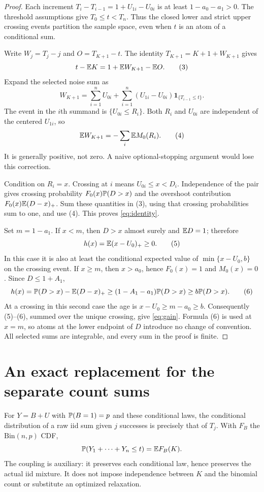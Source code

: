 \documentclass[11pt]{article}
\begin{document}
\begin{proof}
Each increment $T_i-T_{i-1}=1+U_{1i}-U_{0i}$ is at least
$1-a_0-a_1>0$. The threshold assumptions give $T_0\le t<T_n$.
Thus the closed lower and strict upper crossing events partition the
sample space, even when $t$ is an atom of a conditional sum.

Write $W_j=T_j-j$ and $O=T_{K+1}-t$. The identity
$T_{K+1}=K+1+W_{K+1}$ gives
\[
                   t-\mathbb E K=1+\mathbb E W_{K+1}-\mathbb E O.               \tag{3}
\]
Expand the selected noise sum as
\[
 W_{K+1}=\sum_{i=1}^n U_{0i}
       +\sum_{i=1}^n(U_{1i}-U_{0i})\mathbf1_{\{T_{i-1}\le t\}}.
\]
The event in the $i$th summand is $\{U_{0i}\le R_i\}$.
Both $R_i$ and $U_{0i}$ are independent of the centered $U_{1i}$, so
\[
                      \mathbb E W_{K+1}=-\sum_i\mathbb E M_0(R_i).       \tag{4}
\]
It is generally positive, not zero. A naive optional-stopping argument
would lose this correction.

Condition on $R_i=x$. Crossing at $i$ means $U_{0i}\le x<D_i$.
Independence of the pair gives crossing probability
$F_0(x)\mathbb P(D>x)$ and the overshoot contribution
$F_0(x)\mathbb E(D-x)_+$. Sum these quantities in (3), using that crossing
probabilities sum to one, and use (4). This proves \eqref{eq:identity}.

Set $m=1-a_1$. If $x<m$, then $D>x$ almost surely and $\mathbb E D=1$;
therefore
\[
                         h(x)=\mathbb E(x-U_0)_+\ge0.             \tag{5}
\]
In this case it is also at least the conditional expected value of
$\min\{x-U_0,b\}$ on the crossing event. If $x\ge m$, then
$x>a_0$, hence $F_0(x)=1$ and $M_0(x)=0$. Since $D\le1+A_1$,
\[
 h(x)=\mathbb P(D>x)-\mathbb E(D-x)_+
       \ge(1-A_1-a_1)\mathbb P(D>x)\ge b\mathbb P(D>x).               \tag{6}
\]
At a crossing in this second case the age is $x-U_0\ge m-a_0\ge b$.
Consequently (5)--(6), summed over the unique crossing, give
\eqref{eq:gain}. Formula (6) is used at $x=m$, so atoms at the lower
endpoint of $D$ introduce no change of convention. All selected sums are
integrable, and every sum in the proof is finite.
\end{proof}

\section*{An exact replacement for the separate count sums}
For $Y=B+U$ with $\mathbb P(B=1)=p$ and these conditional laws, the conditional
distribution of a raw iid sum given $j$ successes is precisely that of
$T_j$. With $F_B$ the $\mathrm{Bin}(n,p)$ CDF,
\begin{equation}\label{eq:cdf}
            \mathbb P(Y_1+\cdots+Y_n\le t)=\mathbb E F_B(K).
\end{equation}
The coupling is auxiliary: it preserves each conditional law, hence
preserves the actual iid mixture. It does not impose independence between
$K$ and the binomial count or substitute an optimized relaxation.
\end{document}
